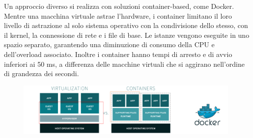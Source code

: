 Un approccio diverso si realizza con soluzioni container-based, come Docker. Mentre una macchina virtuale astrae l'hardware, i container limitano il loro livello di astrazione al solo sistema operativo con la condivisione dello stesso, con il kernel, la connessione di rete e i file di base. Le istanze vengono eseguite in uno spazio separato, garantendo una diminuzione di consumo della CPU e dell'overload associato. Inoltre i container hanno tempi di arresto e di avvio inferiori ai 50 ms, a differenza delle macchine virtuali che si aggirano nell'ordine di grandezza dei secondi.

\begin{figure}[htb!]
    \centering
    \includegraphics[width=11cm]{./Images/cap6/6.1.png}
\end{figure}

